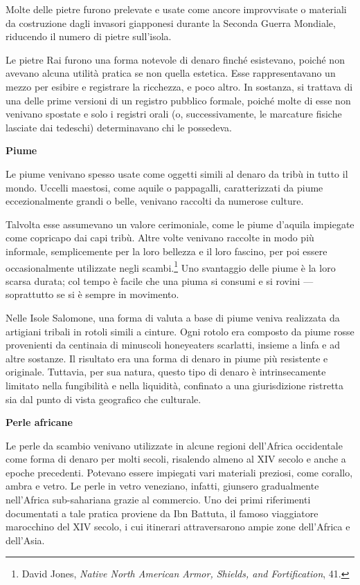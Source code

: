 \documentclass[
  a5paper,
  smalldemyvopaper,10pt,twoside,onecolumn,openright,extrafontsizes,hidelinks]{memoir}
\begin{document}
Molte delle pietre furono prelevate e usate come ancore improvvisate o
materiali da costruzione dagli invasori giapponesi durante la Seconda
Guerra Mondiale, riducendo il numero di pietre sull'isola.

Le pietre Rai furono una forma notevole di denaro finché esistevano,
poiché non avevano alcuna utilità pratica se non quella estetica. Esse
rappresentavano un mezzo per esibire e registrare la ricchezza, e poco
altro. In sostanza, si trattava di una delle prime versioni di un
registro pubblico formale, poiché molte di esse non venivano spostate e
solo i registri orali (o, successivamente, le marcature fisiche lasciate
dai tedeschi) determinavano chi le possedeva.

\textbf{Piume}

Le piume venivano spesso usate come oggetti simili al denaro da tribù in
tutto il mondo. Uccelli maestosi, come aquile o pappagalli,
caratterizzati da piume eccezionalmente grandi o belle, venivano
raccolti da numerose culture.

Talvolta esse assumevano un valore cerimoniale, come le piume d'aquila
impiegate come copricapo dai capi tribù. Altre volte venivano raccolte
in modo più informale, semplicemente per la loro bellezza e il loro
fascino, per poi essere occasionalmente utilizzate negli
scambi.\footnote{David Jones, \emph{Native North American Armor,
  Shields, and Fortification}, 41.} Uno svantaggio delle piume è la loro
scarsa durata; col tempo è facile che una piuma si consumi e si rovini
--- soprattutto se si è sempre in movimento.

Nelle Isole Salomone, una forma di valuta a base di piume veniva
realizzata da artigiani tribali in rotoli simili a cinture. Ogni rotolo
era composto da piume rosse provenienti da centinaia di minuscoli
honeyeaters scarlatti, insieme a linfa e ad altre sostanze. Il risultato
era una forma di denaro in piume più resistente e originale. Tuttavia,
per sua natura, questo tipo di denaro è intrinsecamente limitato nella
fungibilità e nella liquidità, confinato a una giurisdizione ristretta
sia dal punto di vista geografico che culturale.

\textbf{Perle africane}

Le perle da scambio venivano utilizzate in alcune regioni dell'Africa
occidentale come forma di denaro per molti secoli, risalendo almeno al
XIV secolo e anche a epoche precedenti. Potevano essere impiegati vari
materiali preziosi, come corallo, ambra e vetro. Le perle in vetro
veneziano, infatti, giunsero gradualmente nell'Africa sub-sahariana
grazie al commercio. Uno dei primi riferimenti documentati a tale
pratica proviene da Ibn Battuta, il famoso viaggiatore marocchino del
XIV secolo, i cui itinerari attraversarono ampie zone dell'Africa e
dell'Asia.
\end{document}

